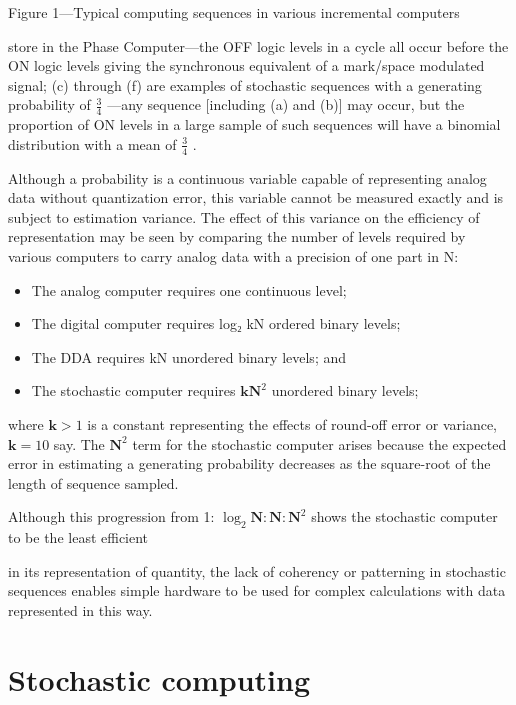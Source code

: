 \documentclass[
  10
]{article}
\providecommand{\tightlist}{%
  \setlength{\itemsep}{0pt}\setlength{\parskip}{0pt}}
\begin{document}
Figure 1---Typical computing sequences in various incremental computers

store in the Phase Computer---the OFF logic levels in a cycle all occur
before the ON logic levels giving the synchronous equivalent of a
mark/space modulated signal; (c) through (f) are examples of stochastic
sequences with a generating probability of \(\frac{3}{4}\) ---any
sequence {[}including (a) and (b){]} may occur, but the proportion of ON
levels in a large sample of such sequences will have a binomial
distribution with a mean of \(\frac{3}{4}\) .

Although a probability is a continuous variable capable of representing
analog data without quantization error, this variable cannot be measured
exactly and is subject to estimation variance. The effect of this
variance on the efficiency of representation may be seen by comparing
the number of levels required by various computers to carry analog data
with a precision of one part in N:

\begin{itemize}
\tightlist
\item
  The analog computer requires one continuous level;\\
\item
  The digital computer requires log₂ kN ordered binary levels;\\
\item
  The DDA requires kN unordered binary levels; and\\
\item
  The stochastic computer requires \(\mathbf{kN}^2\) unordered binary
  levels;
\end{itemize}

where \(\mathbf{k} > 1\) is a constant representing the effects of
round-off error or variance, \(\mathbf{k} = 10\) say. The
\(\mathbf{N}^2\) term for the stochastic computer arises because the
expected error in estimating a generating probability decreases as the
square-root of the length of sequence sampled.

Although this progression from 1:
\(\log_2\mathbf{N}:\mathbf{N}:\mathbf{N}^2\) shows the stochastic
computer to be the least efficient

in its representation of quantity, the lack of coherency or patterning
in stochastic sequences enables simple hardware to be used for complex
calculations with data represented in this way.

\section{Stochastic computing}\label{stochastic-computing-1}
\end{document}
